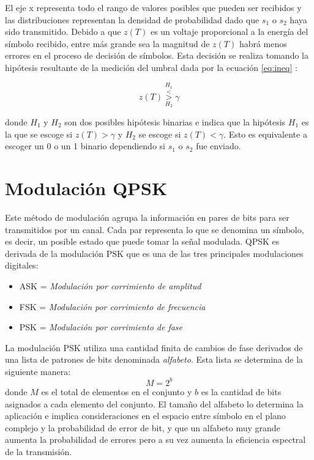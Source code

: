 El eje x representa todo el rango de valores posibles que pueden ser recibidos y las distribuciones
representan la densidad de probabilidad dado que $s_1$ o $s_2$ haya sido transmitido. Debido a que
$z(T)$ es un voltaje proporcional a la energ\'ia del s\'imbolo recibido, entre m\'as grande sea la
magnitud de $z(T)$ habr\'a menos errores en el proceso de decisi\'on de s\'imbolos. Esta decisi\'on
se realiza tomando la hip\'otesis resultante de la medici\'on del umbral dada por la ecuaci\'on
\ref{eq:ineq} \cite{sklar}:

\begin{equation}\label{eq:ineq}
z(T)\overset{H_1}{\underset{H_2}{\overset{<}{>}}}\gamma
\end{equation}

donde $H_1$ y $H_2$ son dos posibles hip\'otesis binarias e indica que la hip\'otesis $H_1$ es la que se
escoge si $z(T)>\gamma$ y $H_2$ se escoge si $z(T)< \gamma$. Esto es equivalente a escoger un 0 o un
1 binario dependiendo si $s_1$ o $s_2$ fue enviado.
\section{Modulaci\'on QPSK}

Este m\'etodo de modulaci\'on agrupa la informaci\'on en pares de
bits para ser transmitidos por un canal. Cada par representa lo que se denomina
un s\'imbolo, es decir, un posible estado que puede tomar la se\~nal modulada.
QPSK es derivada de la modulaci\'on PSK que es una de las tres principales
modulaciones digitales:
\begin{itemize}
  \item ASK = \emph{Modulaci\'on por corrimiento de amplitud}
  \item FSK = \emph{Modulaci\'on por corrimiento de frecuencia}
  \item PSK = \emph{Modulaci\'on por corrimiento de fase}
\end{itemize}

La modulaci\'on PSK utiliza una cantidad finita de cambios de fase derivados de
una lista de patrones de bits denominada \emph{alfabeto}. Esta lista se
determina de la siguiente manera:
\begin{equation}\label{eq:levels}
M=2^b
\end{equation}
donde $M$ es el total de elementos en el conjunto y $b$ es la cantidad de bits
asignados a cada elemento del conjunto. El tama\~no del alfabeto lo determina la
aplicaci\'on e implica consideraciones en el espacio entre s\'imbolo en el plano
complejo y la probabilidad de error de bit, y que un alfabeto muy grande aumenta
la probabilidad de errores pero a su vez aumenta la eficiencia espectral de la
transmisi\'on.


